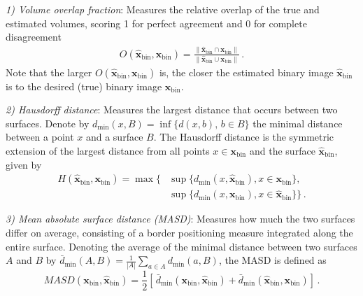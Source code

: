 \documentclass[10pt]{IEEEtran}
\newcommand{\cred}{}
\newcommand{\vx}{\mathbf{x}}
\newcommand{\vxh}{\hat{\mathbf{x}}}
\begin{document}
\textit{1) Volume overlap fraction}: Measures the relative overlap of the true and estimated volumes, scoring 1 for perfect agreement and 0 for complete disagreement
\begin{align}
    O(\vxh_{\text{bin}},\vx_{\text{bin}}) = \frac{\|\vxh_{\text{bin}}\cap\vx_{\text{bin}}\|}{\|\vxh_{\text{bin}}\cup\vx_{\text{bin}}\|} \,.
    \nonumber
\end{align}
Note that the larger $O(\vxh_{\text{bin}},\vx_{\text{bin}})$ is, the closer the estimated binary image $\vxh_{\text{bin}}$ is to the desired (true) binary image $\vx_{\text{bin}}$.



\textit{2) Hausdorff distance}: Measures the largest distance that occurs between two surfaces. Denote by $d_{\min}(x,B)=\inf\{d(x,b), \,b\in B\}$ the minimal distance between a point $x$ and a surface $B$. The Hausdorff distance is the symmetric extension of the largest distance from all points $x\in\vx_{\text{bin}}$ and the surface $\vxh_{\text{bin}}$, given by
\begin{align}
    H(\vxh_{\text{bin}},\vx_{\text{bin}}) = \max\{
    & \sup\{d_{\min}(x,\vxh_{\text{bin}}),x\in\vx_{\text{bin}}\},
    \nonumber\\ & \nonumber
    \sup\{d_{\min}(x,\vx_{\text{bin}}),x\in\vxh_{\text{bin}}\}
    \} \,.
\end{align}

\textit{3) Mean absolute surface distance (MASD)}: Measures how much the two surfaces differ on average, consisting of a border positioning measure integrated along the entire surface. Denoting the average of the minimal distance between two surfaces $A$ and $B$ by $\bar{d}_{\min}(A,B)=\frac{1}{|A|}\sum_{a\in A} d_{\min}(a,B)$, the MASD is defined as 
\[MASD(\vx_{\text{bin}},\vxh_{\text{bin}}) = \frac{1}{2}[\,\bar{d}_{\min}(\vx_{\text{bin}},\vxh_{\text{bin}})+\bar{d}_{\min}(\vxh_{\text{bin}},\vx_{\text{bin}})] \,.\]



















\end{document}
